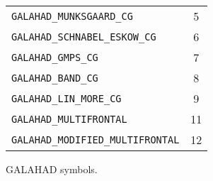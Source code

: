 \documentclass{galahad}
\begin{document}
\begin{figure}[htbp]
\begin{center}
\begin{tabular}{|l|c|}
{\tt GALAHAD\_MUNKSGAARD\_CG}       &  5 \\
{\tt GALAHAD\_SCHNABEL\_ESKOW\_CG}  &  6 \\
{\tt GALAHAD\_GMPS\_CG}             &  7 \\
{\tt GALAHAD\_BAND\_CG}             &  8 \\
{\tt GALAHAD\_LIN\_MORE\_CG}        &  9 \\
{\tt GALAHAD\_MULTIFRONTAL}         &  11 \\
{\tt GALAHAD\_MODIFIED\_MULTIFRONTAL} &  12 \\
\hline
\end{tabular}
\end{center}
\caption{\label{symb1}GALAHAD symbols.}
\end{figure}


\begin{figure}[t]
\begin{center}


\end{center}
\end{figure}
\end{document}
